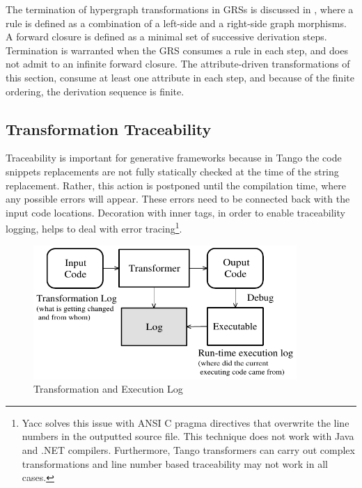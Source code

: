 The termination of hypergraph transformations in GRSs is discussed in \cite{Plump.95}, where a rule is defined as a combination of a left-side and a right-side graph morphisms. A forward closure is defined as a minimal set of successive derivation steps. Termination is warranted when the GRS consumes a rule in each step, and does not admit to an infinite forward closure. The attribute-driven transformations of this section, consume at least one attribute in each step, and because of the finite ordering, the derivation sequence is finite.

\subsection{Transformation Traceability}
\label{sec.tango.trace}

Traceability is important for generative frameworks because in Tango the code snippets replacements are not fully statically checked at the time of the string replacement. Rather, this action is postponed until the compilation time, where any possible errors will appear. These errors need to be connected back with the input code locations. Decoration with inner tags, in order to enable traceability logging, helps to deal with error tracing\footnote{Yacc \cite{yacc} solves this issue with ANSI C pragma directives that overwrite the line numbers in the outputted source file. This technique does not work with Java and .NET compilers. Furthermore, Tango transformers can carry out complex transformations and line number based traceability may not work in all cases.}.

\begin{figure}[ht]
		\centering
		\includegraphics[width=10cm,height=!]{ch04/log}
	\caption{Transformation and Execution Log}
	\label{fig:ch04log}
\end{figure}

